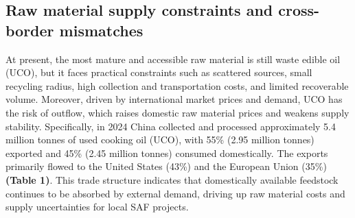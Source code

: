 \documentclass[a4paper,11pt]{article}
\begin{document}
\subsection{Raw material supply constraints and cross-border mismatches}
At present, the most mature and accessible raw material is still waste edible oil (UCO), but it faces practical constraints such as scattered sources, small recycling radius, high collection and transportation costs, and limited recoverable volume. Moreover, driven by international market prices and demand, UCO has the risk of outflow, which raises domestic raw material prices and weakens supply stability. Specifically, in 2024 China collected and processed approximately 5.4 million tonnes of used cooking oil (UCO), with 55\% (2.95 million tonnes) exported and 45\% (2.45 million tonnes) consumed domestically. The exports primarily flowed to the United States (43\%) and the European Union (35\%) \textbf{(Table 1)}. This trade structure indicates that domestically available feedstock continues to be absorbed by external demand, driving up raw material costs and supply uncertainties for local SAF projects.
\end{document}
